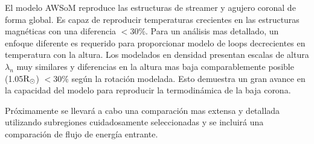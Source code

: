 \documentclass[baaa]{baaa}
\begin{document}
El modelo AWSoM reproduce las estructuras de streamer y agujero coronal de forma global. Es capaz de reproducir temperaturas crecientes en las estructuras magnéticas con una diferencia $<30 \%$. Para un análisis mas detallado, un enfoque diferente es requerido para proporcionar modelo de loops decrecientes en temperatura con la altura. Los modelados en densidad presentan escalas de altura $\lambda_n$ muy similares y diferencias en la altura mas baja comparablemente posible (1.05${\rm R_\odot}$) $<30 \%$ según la rotación modelada. Esto demuestra un gran avance en la capacidad del modelo para reproducir la termodinámica de la baja corona.

Próximamente se llevará a cabo una comparación mas extensa y detallada utilizando subregiones cuidadosamente seleccionadas y se incluirá una comparación de flujo de energía entrante.





\small

 
\end{document}
